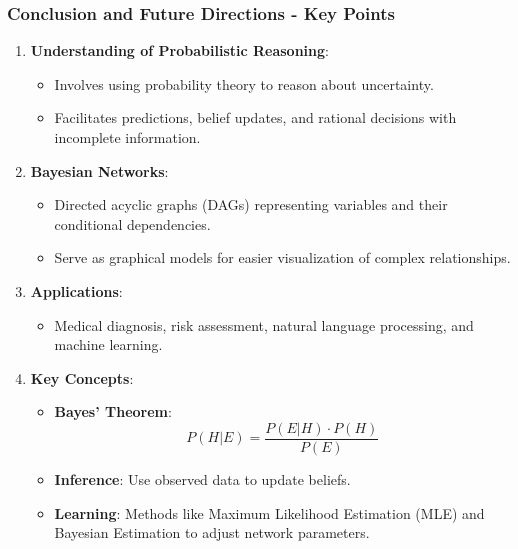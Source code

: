 \documentclass[aspectratio=169]{beamer}
\begin{document}
\begin{frame}[fragile]
  \frametitle{Conclusion and Future Directions - Key Points}

  \begin{enumerate}
    \item \textbf{Understanding of Probabilistic Reasoning}:
    \begin{itemize}
      \item Involves using probability theory to reason about uncertainty.
      \item Facilitates predictions, belief updates, and rational decisions with incomplete information.
    \end{itemize}
    
    \item \textbf{Bayesian Networks}:
    \begin{itemize}
      \item Directed acyclic graphs (DAGs) representing variables and their conditional dependencies.
      \item Serve as graphical models for easier visualization of complex relationships.
    \end{itemize}
    
    \item \textbf{Applications}:
    \begin{itemize}
      \item Medical diagnosis, risk assessment, natural language processing, and machine learning.
    \end{itemize}
    
    \item \textbf{Key Concepts}:
    \begin{itemize}
      \item \textbf{Bayes' Theorem}:
      \begin{equation}
      P(H|E) = \frac{P(E|H) \cdot P(H)}{P(E)}
      \end{equation}
      \item \textbf{Inference}: Use observed data to update beliefs.
      \item \textbf{Learning}: Methods like Maximum Likelihood Estimation (MLE) and Bayesian Estimation to adjust network parameters.
    \end{itemize}
  \end{enumerate}
\end{frame}
\end{document}
